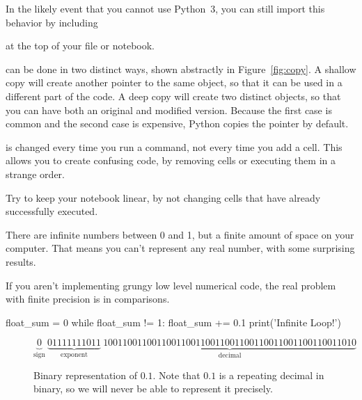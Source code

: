 \documentclass[justified, nobib]{tufte-handout}
\begin{document}
\noindent
In the likely event that you cannot use Python~3, you can still import this behavior by including

\hspace{25pt}

\noindent
at the top of your file or notebook.

 can be done in two distinct ways, shown abstractly in Figure~\ref{fig:copy}.
A shallow copy will create another pointer to the same object, so that it can be used in a different part of the code.
A deep copy will create two distinct objects, so that you can have both an original and modified version.
Because the first case is common and the second case is expensive, Python copies the pointer by default.



\begin{marginfigure}[-10\baselineskip]%
    \vspace*{\fill}
    \centering

    \def\svgwidth{75pt}

    \vspace*{\fill}
    \bigskip
    \def\svgwidth{140pt}
  \caption{%
The finger pointing at the moon is not the moon}
\label{fig:copy}
\end{marginfigure}

\pagebreak

 is changed every time you run a command, not
every time you add a cell.
This allows you to create confusing code, by removing cells or executing them in a strange order.



\noindent
Try to keep your notebook linear, by not changing cells that have already successfully executed.

There are infinite numbers between 0 and 1, but a finite amount of space on your computer.
That means you can't represent any real number, with some surprising results.



\noindent
If you aren't implementing grungy low level numerical code, the real problem with finite precision is in comparisons.
\begin{pythoncode}
        float_sum = 0
        while float_sum != 1:
            float_sum += 0.1
            print('Infinite Loop!')
\end{pythoncode}
\begin{figure}[!hb]
\small
$$\underbrace{0}_{\text{sign}} \: \underbrace{01111111011}_{\text{exponent}} \: \underbrace{1001100110011001100110011001100110011001100110011010}_{\text{decimal}}$$
\caption{Binary representation of $0.1$. Note that $0.1$ is a repeating decimal in binary, so we will never be able to represent it precisely.}
\end{figure}
\pagebreak
\end{document}
